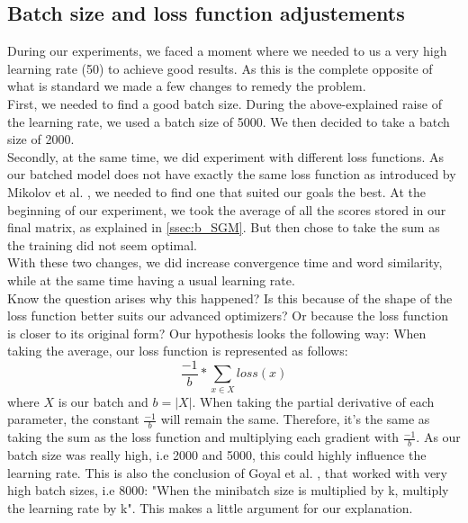 \subsection{Batch size and loss function adjustements}\label{ssec:bs_lf}
During our experiments, we faced a moment where we needed to us a very high learning rate (50) to achieve good results. As this is the complete opposite of what is standard we made a few changes to remedy the problem.\\
First, we needed to find a good batch size. During the above-explained raise of the learning rate, we used a batch size of 5000. We then decided to take a batch size of 2000.\\
Secondly, at the same time, we did experiment with different loss functions. As our batched model does not have exactly the same loss function as introduced by Mikolov et al. \cite{mikolov}, we needed to find one that suited our goals the best. At the beginning of our experiment, we took the average of all the scores stored in our final matrix, as explained in \ref{ssec:b_SGM}. But then chose to take the sum as the training did not seem optimal.\\
With these two changes, we did increase convergence time and word similarity, while at the same time having a usual learning rate. \\
Know the question arises why this happened? Is this because of the shape of the loss function better suits our advanced optimizers? Or because the loss function is closer to its original form? Our hypothesis looks the following way:
When taking the average, our loss function is represented as follows:
\begin{equation}
\frac{-1}{b }* \sum_{x\in X} loss(x)
\end{equation}
where $X$ is our batch and $b = |X|$.
When taking the partial derivative of each parameter, the constant $ \frac{-1}{b }$ will remain the same. Therefore, it's the same as taking the sum as the loss function and multiplying each gradient with $\frac{-1}{b }$. As our batch size was really high, i.e 2000 and 5000, this could highly influence the learning rate. This is also the conclusion of Goyal et al. \cite{fb}, that worked with very high batch sizes, i.e 8000: "When the minibatch size is multiplied by k, multiply the learning rate by k". This makes a little argument for our explanation.

